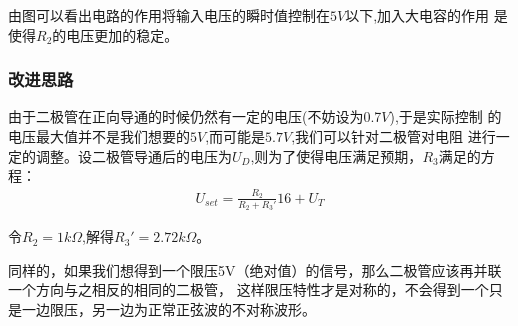 \documentclass[UTF8]{ctexart}
\begin{document}
由图可以看出电路的作用将输入电压的瞬时值控制在$5V$以下,加入大电容的作用
是使得$R_2$的电压更加的稳定。


\subsubsection*{改进思路}
由于二极管在正向导通的时候仍然有一定的电压(不妨设为0.7$V$),于是实际控制
的电压最大值并不是我们想要的$5V$,而可能是$5.7V$,我们可以针对二极管对电阻
进行一定的调整。设二极管导通后的电压为$U_D$,则为了使得电压满足预期，$R_3$满足的方程：
\begin{align}
    U_{set} = \frac{R_2}{R_2 + R_3'}16 + U_T
\end{align}

令$R_2= 1k\Omega$,解得$R_3' = 2.72k\Omega$。

同样的，如果我们想得到一个限压5V（绝对值）的信号，那么二极管应该再并联一个方向与之相反的相同的二极管，
这样限压特性才是对称的，不会得到一个只是一边限压，另一边为正常正弦波的不对称波形。
\end{document}
